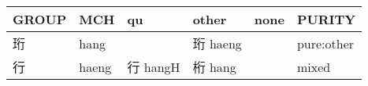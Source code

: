 \documentclass[14pt,a4paper]{scrartcl}
\begin{document}
\begin{longtable}[c]{@{}llllll@{}}
\toprule
\begin{minipage}[b]{0.14\columnwidth}\raggedright\strut
GROUP
\strut\end{minipage} &
\begin{minipage}[b]{0.14\columnwidth}\raggedright\strut
MCH
\strut\end{minipage} &
\begin{minipage}[b]{0.14\columnwidth}\raggedright\strut
qu
\strut\end{minipage} &
\begin{minipage}[b]{0.14\columnwidth}\raggedright\strut
other
\strut\end{minipage} &
\begin{minipage}[b]{0.14\columnwidth}\raggedright\strut
none
\strut\end{minipage} &
\begin{minipage}[b]{0.14\columnwidth}\raggedright\strut
PURITY
\strut\end{minipage}\tabularnewline
\midrule
\endhead
\begin{minipage}[t]{0.14\columnwidth}\raggedright\strut
珩
\strut\end{minipage} &
\begin{minipage}[t]{0.14\columnwidth}\raggedright\strut
hang
\strut\end{minipage} &
\begin{minipage}[t]{0.14\columnwidth}\raggedright\strut
\strut\end{minipage} &
\begin{minipage}[t]{0.14\columnwidth}\raggedright\strut
珩 haeng
\strut\end{minipage} &
\begin{minipage}[t]{0.14\columnwidth}\raggedright\strut
\strut\end{minipage} &
\begin{minipage}[t]{0.14\columnwidth}\raggedright\strut
pure:other
\strut\end{minipage}\tabularnewline
\begin{minipage}[t]{0.14\columnwidth}\raggedright\strut
行
\strut\end{minipage} &
\begin{minipage}[t]{0.14\columnwidth}\raggedright\strut
haeng
\strut\end{minipage} &
\begin{minipage}[t]{0.14\columnwidth}\raggedright\strut
行 hangH
\strut\end{minipage} &
\begin{minipage}[t]{0.14\columnwidth}\raggedright\strut
桁 hang
\strut\end{minipage} &
\begin{minipage}[t]{0.14\columnwidth}\raggedright\strut
\strut\end{minipage} &
\begin{minipage}[t]{0.14\columnwidth}\raggedright\strut
mixed
\strut\end{minipage}\tabularnewline
\bottomrule
\end{longtable}
\end{document}
